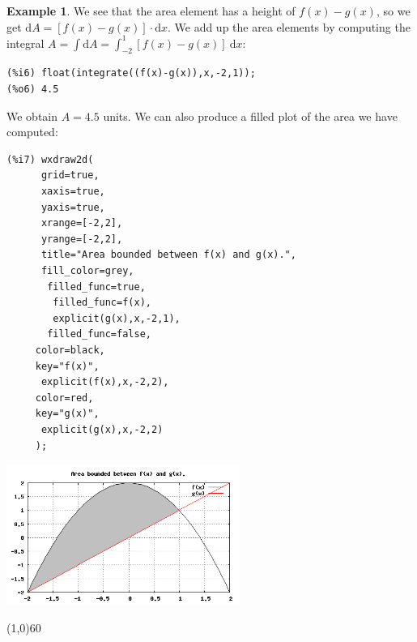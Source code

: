 \documentclass[10.5pt,twoside]{report}
\theoremstyle{definition}
\newtheorem{exmp}{Example}[section]
\begin{document}
\begin{exmp}
We see that the area element has a height of $f(x)-g(x)$, so we get $\mathrm{d}A=[f(x)-g(x)]\cdot \mathrm{d}x$.  We add up the area elements by computing the integral $A=\displaystyle \int  \mathrm{d}A=\displaystyle \int_{-2}^{1} [f(x)-g(x)]\ \mathrm{d}x $:

\begin{verbatim}
(%i6) float(integrate((f(x)-g(x)),x,-2,1));
(%o6) 4.5
\end{verbatim}

We obtain $A=4.5$ units.  We can also produce a filled plot of the area we have computed:

\begin{verbatim}
(%i7) wxdraw2d(
      grid=true,
      xaxis=true,
      yaxis=true,
      xrange=[-2,2],
      yrange=[-2,2],
      title="Area bounded between f(x) and g(x).",
      fill_color=grey,
       filled_func=true,
        filled_func=f(x),
        explicit(g(x),x,-2,1),
       filled_func=false,
     color=black,
     key="f(x)",
      explicit(f(x),x,-2,2),
     color=red,
     key="g(x)",
      explicit(g(x),x,-2,2)
     );
\end{verbatim}

\includegraphics[width=3in]{example_3_1_2_3}

\end{exmp}

\line(1,0){60}
\linethickness{0.5mm}
\end{document}
